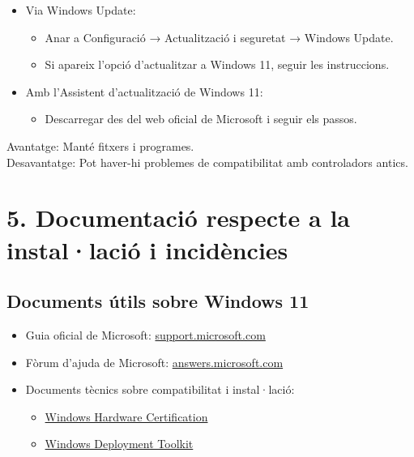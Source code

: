 \documentclass[
  12 pt,
  a4paper,
]{article}
\providecommand{\tightlist}{%
  \setlength{\itemsep}{0pt}\setlength{\parskip}{0pt}}
\begin{document}
\begin{itemize}
\item
  Via Windows Update:

  \begin{itemize}
  \item
    Anar a Configuració → Actualització i seguretat → Windows Update.
  \item
    Si apareix l'opció d'actualitzar a Windows 11, seguir les
    instruccions.
  \end{itemize}
\item
  Amb l'Assistent d'actualització de Windows 11:

  \begin{itemize}
  \tightlist
  \item
    Descarregar des del web oficial de Microsoft i seguir els passos.
  \end{itemize}
\end{itemize}

Avantatge: Manté fitxers i programes.\\
Desavantatge: Pot haver-hi problemes de compatibilitat amb controladors
antics.

\section{5. Documentació respecte a la instal·lació i
incidències}\label{documentaciuxf3-respecte-a-la-installaciuxf3-i-inciduxe8ncies}

\subsection{Documents útils sobre Windows
11}\label{documents-uxfatils-sobre-windows-11}

\begin{itemize}
\item
  Guia oficial de Microsoft:
  \href{https://support.microsoft.com}{support.microsoft.com}
\item
  Fòrum d'ajuda de Microsoft:
  \href{https://answers.microsoft.com}{answers.microsoft.com}
\item
  Documents tècnics sobre compatibilitat i instal·lació:

  \begin{itemize}
  \item
    \href{https://docs.microsoft.com/en-us/windows-hardware/}{Windows
    Hardware Certification}
  \item
    \href{https://docs.microsoft.com/en-us/windows/deployment/}{Windows
    Deployment Toolkit}
  \end{itemize}
\end{itemize}
\end{document}
